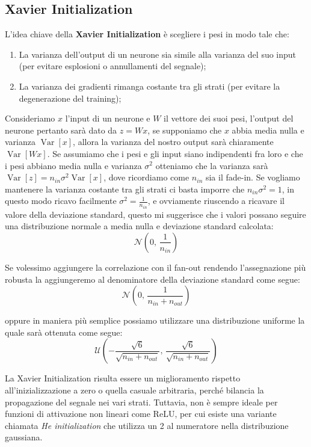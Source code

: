 \subsection{Xavier Initialization}
L’idea chiave della \textbf{Xavier Initialization} è scegliere i pesi in modo tale che:
\begin{enumerate}
    \item La varianza dell'output di un neurone sia simile alla varianza del suo input (per evitare esplosioni o annullamenti del segnale);
    \item La varianza dei gradienti rimanga costante tra gli strati (per evitare la degenerazione del training);
\end{enumerate}
Consideriamo $x$ l'input di un neurone e $W$ il vettore dei suoi pesi, l'output del neurone pertanto sarà dato da $z=Wx$, se supponiamo che $x$ abbia media nulla e varianza $\operatorname{Var}[x]$, allora la varianza del nostro output sarà chiaramente $\operatorname{Var}[Wx]$. Se assumiamo che i pesi e gli input siano indipendenti fra loro e che i pesi abbiano media nulla e varianza $\sigma^2$ otteniamo che la varianza sarà $\operatorname{Var}[z]=n_{in}\sigma^2\operatorname{Var}[x]$, dove ricordiamo come $n_{in}$ sia il fade-in. Se vogliamo mantenere la varianza costante tra gli strati ci basta imporre che $n_{in}\sigma^2=1$, in questo modo ricavo facilmente $\sigma^2=\frac{1}{n_{in}}$, e ovviamente riuscendo a ricavare il valore della deviazione standard, questo mi suggerisce che i valori possano seguire una distribuzione normale a media nulla e deviazione standard calcolata:
\begin{equation}
    \mathcal{N}\left(0,\,\frac{1}{n_{in}}\right)
\end{equation}

Se volessimo aggiungere la correlazione con il fan-out rendendo l'assegnazione più robusta la aggiungeremo al denominatore della deviazione standard come segue:
\begin{equation}
       \mathcal{N}\left(0,\,\frac{1}{n_{in}+n_{out}}\right) 
\end{equation}
 
oppure in maniera più semplice possiamo utilizzare una distribuzione uniforme la quale sarà ottenuta come segue:
\begin{equation}
    \mathcal{U}\left(-\frac{\sqrt{6}}{\sqrt{n_{in}+n_{out}}},\,\frac{\sqrt{6}}{\sqrt{n_{in}+n_{out}}}\right)
\end{equation}

La Xavier Initialization risulta essere un miglioramento rispetto all'inizializzazione a zero o quella casuale arbitraria, perché bilancia la propagazione del segnale nei vari strati. Tuttavia, non è sempre ideale per funzioni di attivazione non lineari come ReLU, per cui esiste una variante chiamata \textit{He initialization} che utilizza un 2 al numeratore nella distribuzione gaussiana.

